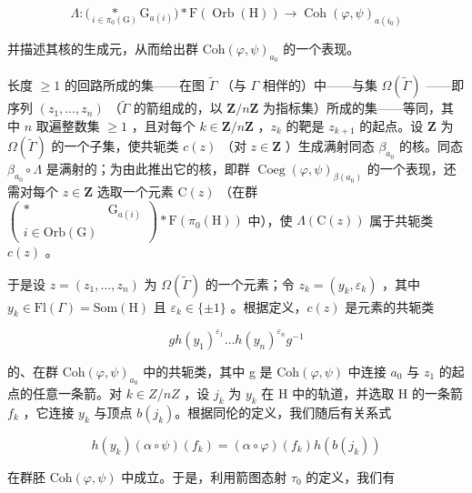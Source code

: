 \[
\Lambda \colon \bigl (\underset {i \in \pi_ {0} (\mathrm{G})} {*} \mathrm{G} _ {a (i)} \bigr) * \mathrm{F} (\operatorname{Orb} (\mathrm{H})) \to \operatorname{Coh} (\varphi , \psi) _ {a (i _ {0})}
\]

并描述其核的生成元，从而给出群 \(\mathrm{Coh}(\varphi,\psi)_{a_{0}}\) 的一个表现。

长度 \(\geqslant 1\) 的回路所成的集——在图 \(\widetilde{\Gamma}\) （与 \(\Gamma\) 相伴的）中——与集 \(\Omega(\widetilde{\Gamma})\) ——即序列 \((z_1, \ldots, z_n)\) （\(\widetilde{\Gamma}\) 的箭组成的，以 \(\mathbf{Z}/n\mathbf{Z}\) 为指标集）所成的集——等同，其中 \(n\) 取遍整数集 \(\geqslant 1\) ，且对每个 \(k \in \mathbf{Z}/n\mathbf{Z}\) ，\(z_k\) 的靶是 \(z_{k+1}\) 的起点。设 \(\mathbf{Z}\) 为 \(\Omega(\widetilde{\Gamma})\) 的一个子集，使共轭类 \(c(z)\) （对 \(z \in \mathbf{Z}\) ）生成满射同态 \(\beta_{a_0}\) 的核。同态 \(\beta_{a_0} \circ \Lambda\) 是满射的；为由此推出它的核，即群 \(\operatorname{Coeg}(\varphi, \psi)_{\beta(a_0)}\) 的一个表现，还需对每个 \(z \in \mathbf{Z}\) 选取一个元素 \(\mathrm{C}(z)\) （在群 \(\left( \begin{array}{cc} * & \mathrm{G}_{a(i)} \\ i \in \mathrm{Orb}(\mathrm{G}) & \end{array} \right) * \mathrm{F}(\pi_0(\mathrm{H}))\) 中），使 \(\Lambda(\mathrm{C}(z))\) 属于共轭类 \(c(z)\) 。

于是设 \(z = (z_{1}, \ldots, z_{n})\) 为 \(\Omega(\tilde{\Gamma})\) 的一个元素；令 \(z_{k} = (y_{k}, \varepsilon_{k})\) ，其中 \(y_{k} \in \mathrm{Fl}(\Gamma) = \mathrm{Som}(\mathrm{H})\) 且 \(\varepsilon_{k} \in \{\pm 1\}\) 。根据定义，\(c(z)\) 是元素的共轭类

\[
g h (y _ {1}) ^ {\varepsilon_ {1}} \dots h (y _ {n}) ^ {\varepsilon_ {n}} g ^ {- 1}
\]

的、在群 \(\mathrm{Coh}(\varphi,\psi)_{a_{0}}\) 中的共轭类，其中 g 是 \(\mathrm{Coh}(\varphi,\psi)\) 中连接 \(a_{0}\) 与 \(z_{1}\) 的起点的任意一条箭。对 \(k \in Z/nZ\) ，设 \(j_{k}\) 为 \(y_{k}\) 在 H 中的轨道，并选取 H 的一条箭 \(f_{k}\) ，它连接 \(y_{k}\) 与顶点 \(b(j_{k})\)。根据同伦的定义，我们随后有关系式

\[
h (y _ {k}) (\alpha \circ \psi) (f _ {k}) = (\alpha \circ \varphi) (f _ {k}) h (b (j _ {k}))
\]

在群胚 \(\mathrm{Coh}(\varphi,\psi)\) 中成立。于是，利用箭图态射 \(\tau_{0}\) 的定义，我们有


